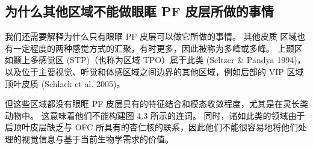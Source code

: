 \subsection{为什么其他区域不能做眼眶 PF 皮层所做的事情}
我们还需要解释为什么只有眼眶 PF 皮层可以做它所做的事情。 其他皮质
区域也有一定程度的两种感觉方式的汇聚，有时更多，因此被称为多峰或多峰。 上颞区如颞上多感觉区 (STP)（也称为区域 TPO）属于此类
(Seltzer \& Pandya 1994)，以及位于主要视觉、听觉和体感区域之间边界的其他区域，例如后部的 VIP 区域顶叶皮质 (Schlack et al. 2005)。\par
但这些区域都没有眼眶 PF 皮层具有的特征结合和模态收敛程度，尤其是在灵长类动物中。 这意味着他们不能构建图 4.3 所示的连词。 同时，诸如此类的领域由于后顶叶皮层缺乏与 OFC 所具有的杏仁核的联系，因此他们不能很容易地将他们处理的视觉信息与基于当前生物学需求的价值。\par
